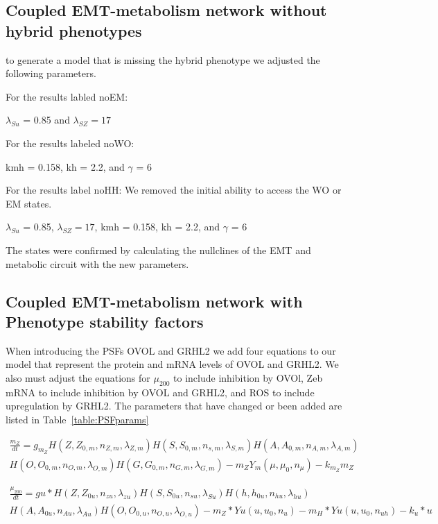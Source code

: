 \documentclass{article}
\begin{document}
\FloatBarrier
\subsection{Coupled EMT-metabolism network without hybrid phenotypes}
to generate a model that is missing the hybrid phenotype we adjusted the following parameters. 

For the results labled noEM:

$\lambda_{Su}$ = 0.85 and $\lambda_{SZ} = 17$

\vspace{0.5cm}
For the results labeled noWO:

kmh = 0.158, kh = 2.2, and $\gamma$ = 6

\vspace{0.5cm}

For the results label noHH:
We removed the initial ability to access the WO or EM states.

$\lambda_{Su}$ = 0.85, $\lambda_{SZ} = 17$, kmh = 0.158, kh = 2.2, and $\gamma$ = 6

The states were confirmed by calculating the nullclines of the EMT and metabolic circuit with the new parameters.

\FloatBarrier
\subsection{Coupled EMT-metabolism network with Phenotype stability factors}

When introducing the PSFs OVOL and GRHL2  we add four equations to our model that represent the protein and mRNA levels of OVOL and GRHL2.   
We also must adjust the equations for $\mu_{200}$ to include inhibition by OVOl, Zeb mRNA to include inhibition by OVOL and GRHL2,  and ROS to include upregulation by GRHL2. 
The parameters that have changed or been added are listed in Table~\ref{table:PSFparams}

\begin{multline}
\frac{m_Z}{dt} = g_{m_Z} H(Z,Z_{0,m},n_{Z,m},\lambda_{Z,m}) H(S,S_{0,m},n_{s,m},\lambda_{S,m}) H(A,A_{0,m},n_{A,m},\lambda_{A,m})\\H(O,O_{0,m},n_{O,m},\lambda_{O,m})H(G,G_{0,m},n_{G,m},\lambda_{G,m}) - m_Z Y_m(\mu,\mu_0,n_\mu) - k_{m_Z} m_Z
\end{multline}

\begin{multline}
\frac{\mu_{200}}{dt}=gu*H(Z,Z_{0u},n_{zu}, \lambda_{zu}) H(S,S_{0u},n_{su},\lambda_{Su}) H(h,h_{0u},n_{hu},\lambda_{hu})\\ H(A,A_{0u},n_{Au},\lambda_{Au})H(O,O_{0,u},n_{O,u},\lambda_{O,u})-m_Z*Yu(u,u_0,n_u)-m_H*Yu(u,u_0,n_{uh})-k_u*u
\end{multline}
\end{document}
